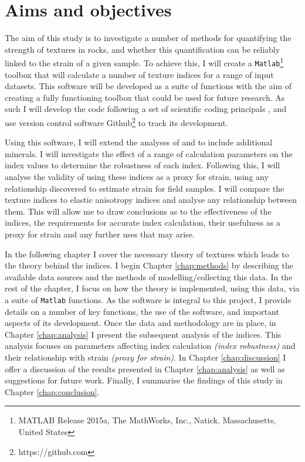 \documentclass[a4paper,12pt,twoside]{report}
\numberwithin{equation}{chapter}
\begin{document}
\section{Aims and objectives} \label{sec:aims+objs}
	
The aim of this study is to investigate a number of methods for quantifying the strength of textures in rocks, and whether this quantification can be reliably linked to the strain of a given sample. To achieve this, I will create a \texttt{Matlab}\footnote{MATLAB Release 2015a, The MathWorks, Inc., Natick, Massachusetts, United States} toolbox that will calculate a number of texture indices for a range of input datasets. This software will be developed as a suite of functions with the aim of creating a fully functioning toolbox that could be used for future research. As such I will develop the code following a set of scientific coding principals \citep{Wilson2014}, and use version control software Github\footnote{https://github.com} to track its development.   

Using this software, I will extend the analyses of \cite{Skemer} and \cite{Mainprice} to include additional minerals. I will investigate the effect of a range of calculation parameters on the index values to determine the robustness of each index. Following this, I will analyse the validity of using these indices as a proxy for strain, using any relationship discovered to estimate strain for field samples. I will compare the texture indices to elastic anisotropy indices and analyse any relationship between them. This will allow me to draw conclusions as to the effectiveness of the indices, the requirements for accurate index calculation, their usefulness as a proxy for strain and any further uses that may arise.  

In the following chapter I cover the necessary theory of textures which leads to the theory behind the indices. I begin Chapter \ref{chap:methods} by describing the available data sources and the methods of modelling/collecting this data. In the rest of the chapter, I focus on how the theory is implemented, using this data, via a suite of \texttt{Matlab} functions. As the software is integral to this project, I provide details on a number of key functions, the use of the software, and important aspects of its development. Once the data and methodology are in place, in Chapter \ref{chap:analysis} I present the subsequent analysis of the indices. This analysis focuses on parameters affecting index calculation \emph{(index robustness)} and their relationship with strain \emph{(proxy for strain)}. In Chapter \ref{chap:discussion} I offer a discussion of the results presented in Chapter \ref{chap:analysis} as well as suggestions for future work. Finally, I summarise the findings of this study in Chapter \ref{chap:conclusion}.   
\end{document}
